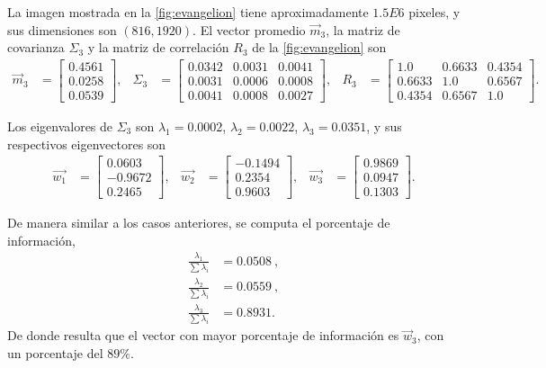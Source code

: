 La imagen mostrada en la \cref{fig:evangelion} tiene aproximadamente $1.5E6$ pixeles, y sus dimensiones son $(816, 1920)$. El vector promedio $\vec{m}_3$, la matriz de covarianza $\Sigma_3$ y la matriz de correlación $R_3$ de la \cref{fig:evangelion} son
\begin{align*}
    \vec{m}_3 & =
    \begin{bmatrix}
        0.4561 \\
        0.0258 \\
        0.0539
    \end{bmatrix}, &
    \Sigma_3 & =
    \begin{bmatrix}
        0.0342 & 0.0031 & 0.0041 \\
        0.0031 & 0.0006 & 0.0008 \\
        0.0041 & 0.0008 & 0.0027
    \end{bmatrix}, &
    R_3 & = 
    \begin{bmatrix}
        1.0    & 0.6633 & 0.4354 \\
        0.6633 & 1.0    & 0.6567 \\
        0.4354 & 0.6567 & 1.0
    \end{bmatrix}.
\end{align*}

Los eigenvalores de $\Sigma_3$ son $\lambda_1 = 0.0002$, $\lambda_2 = 0.0022$, $\lambda_3 = 0.0351$, y sus respectivos eigenvectores son
\begin{align*}
    \vec{w_1} & =
    \begin{bmatrix}
        0.0603 \\
        -0.9672 \\
        0.2465
    \end{bmatrix}, &
    \vec{w_2} & = 
    \begin{bmatrix}
        -0.1494 \\
        0.2354 \\
        0.9603
    \end{bmatrix}, &
    \vec{w_3} & =
    \begin{bmatrix}
        0.9869 \\
        0.0947 \\
        0.1303
    \end{bmatrix}.
\end{align*}

De manera similar a los casos anteriores, se computa el porcentaje de información,
\begin{align*}
    \frac{\lambda_1}{\sum \lambda_i} & = 0.0508\ , \\
    \frac{\lambda_2}{\sum \lambda_i} & = 0.0559\ , \\
    \frac{\lambda_3}{\sum \lambda_i} & = 0.8931 .
\end{align*}
De donde resulta que el vector con mayor porcentaje de información es $\vec{w}_3$, con un porcentaje del $89\%$.

